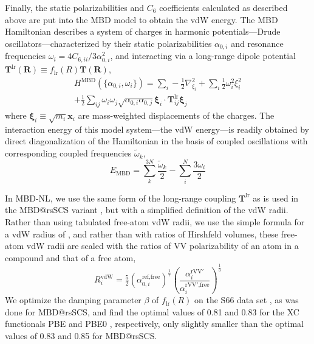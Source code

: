Finally, the static polarizabilities and $C_6$ coefficients calculated as described above are put into the MBD model to obtain the vdW energy.
The MBD Hamiltonian describes a system of charges in harmonic potentials---Drude oscillators---characterized by their static polarizabilities $\alpha_{0,i}$ and resonance frequencies $\omega_i=4C_{6,ii}/3\alpha_{0,i}^2$, and interacting via a long-range dipole potential $\mathbf T^\mathrm{lr}(\mathbf R)\equiv f_\text{lr}(R)\mathbf T(\mathbf R)$,
\begin{multline}
  H^\text{MBD}(\{\alpha_{0,i},\omega_i\})
  =\sum_i-\frac12\nabla_{\xi_i}^2+\sum_i\frac12\omega_i^2\xi_i^2 \\
  +\frac12\sum_{ij}\omega_i\omega_j\sqrt{\alpha_{0,i}\alpha_{0,j}}\boldsymbol{\xi}_i\cdot\mathbf T^\mathrm{lr}_{ij}\boldsymbol{\xi}_j
\end{multline}
where $\boldsymbol\xi_i\equiv\sqrt{m_i}\mathbf x_i$ are mass-weighted displacements of the charges.
The interaction energy of this model system---the vdW energy---is readily obtained by direct diagonalization of the Hamiltonian in the basis of coupled oscillations with corresponding coupled frequencies $\tilde\omega_k$,
\begin{equation}
  E_\text{MBD}=\sum_k^{3N}\frac{\tilde\omega_k}2-\sum_i^N\frac{3\omega_i}2
\end{equation}

In MBD-NL, we use the same form of the long-range coupling $\mathbf T^\text{lr}$ as is used in the MBD@rsSCS variant \citep{AmbrosettiJCP14}, but with a simplified definition of the vdW radii.
Rather than using tabulated free-atom vdW radii, we use the simple formula for a vdW radius of \citet{FedorovPRL18}, and rather than with ratios of Hirshfeld volumes, these free-atom vdW radii are scaled with the ratios of VV polarizability of an atom in a compound and that of a free atom,\begin{equation}
  R_i^\text{vdW}=\tfrac52{(\alpha_{0,i}^\text{ref,free})}^\frac17{\left(\frac{\alpha_i^\mathrm{rVV'}}{\alpha_i^\text{rVV$'$,free}}\right)}^\frac13
\end{equation}
We optimize the damping parameter $\beta$ of $f_\text{lr}(R)$ on the S66 data set \citep{RezacJCTC11}, as was done for MBD@rsSCS, and find the optimal values of 0.81 and 0.83 for the XC functionals PBE \citep{PerdewPRL96} and PBE0 \citep{AdamoJCP99}, respectively, only slightly smaller than the optimal values of 0.83 and 0.85 for MBD@rsSCS.


